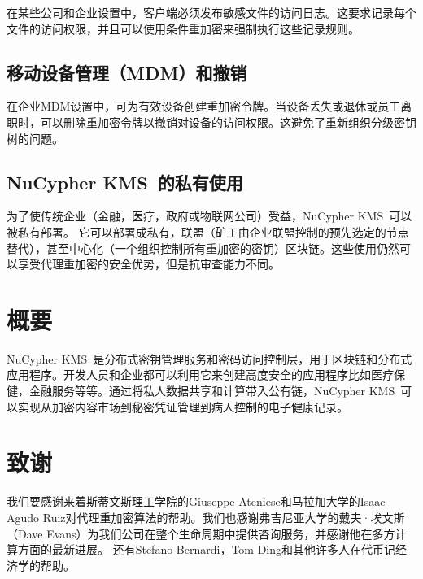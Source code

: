 \documentclass[longbibliography,nofootinbib]{revtex4-1}
\newcommand{\kms}{NuCypher KMS}
\begin{document}
	在某些公司和企业设置中，客户端必须发布敏感文件的访问日志。这要求记录每个文件的访问权限，并且可以使用条件重加密来强制执行这些记录规则。

\subsection{移动设备管理（MDM）和撤销}
\label{sec:mdm}

    在企业MDM设置中，可为有效设备创建重加密令牌。当设备丢失或退休或员工离职时，可以删除重加密令牌以撤销对设备的访问权限。这避免了重新组织分级密钥树的问题。

\subsection{\kms~的私有使用}

	为了使传统企业（金融，医疗，政府或物联网公司）受益，\kms~可以被私有部署。 它可以部署成私有，联盟（矿工由企业联盟控制的预先选定的节点替代），甚至中心化（一个组织控制所有重加密的密钥）区块链。这些使用仍然可以享受代理重加密的安全优势，但是抗审查能力不同。

\section{概要}
	
    \kms~是分布式密钥管理服务和密码访问控制层，用于区块链和分布式应用程序。开发人员和企业都可以利用它来创建高度安全的应用程序比如医疗保健，金融服务等等。通过将私人数据共享和计算带入公有链，\kms~可以实现从加密内容市场到秘密凭证管理到病人控制的电子健康记录。


\section{致谢}

	我们要感谢来着斯蒂文斯理工学院的Giuseppe Ateniese和马拉加大学的Isaac Agudo Ruiz对代理重加密算法的帮助。我们也感谢弗吉尼亚大学的戴夫·埃文斯（Dave Evans）为我们公司在整个生命周期中提供咨询服务，并感谢他在多方计算方面的最新进展。 还有Stefano Bernardi，Tom Ding和其他许多人在代币记经济学的帮助。
    


\end{document}
